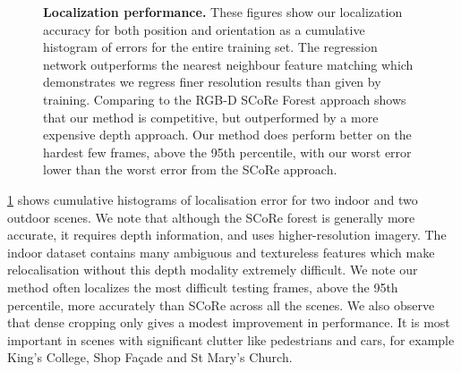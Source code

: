 \begin{figure}[t]
   \caption[Localisation histograms.]{\textbf{Localization performance.} These figures show our localization accuracy for both position and orientation as a cumulative histogram of errors for the entire training set. The regression network outperforms the nearest neighbour feature matching which demonstrates we regress finer resolution results than given by training. Comparing to the RGB-D SCoRe Forest approach shows that our method is competitive, but outperformed by a more expensive depth approach. Our method does perform better on the hardest few frames, above the 95th percentile, with our worst error lower than the worst error from the SCoRe approach. }
   \label{fig:histograms}
\end{figure}

\cref{fig:histograms} shows cumulative histograms of localisation error for two indoor and two outdoor scenes. We note that although the SCoRe forest is generally more accurate, it requires depth information, and uses higher-resolution imagery. The indoor dataset contains many ambiguous and textureless features which make relocalisation without this depth modality extremely difficult. We note our method often localizes the most difficult testing frames, above the 95th percentile, more accurately than SCoRe across all the scenes. We also observe that dense cropping only gives a modest improvement in performance. It is most important in scenes with significant clutter like pedestrians and cars, for example King's College, Shop Fa\c cade and St Mary's Church.

